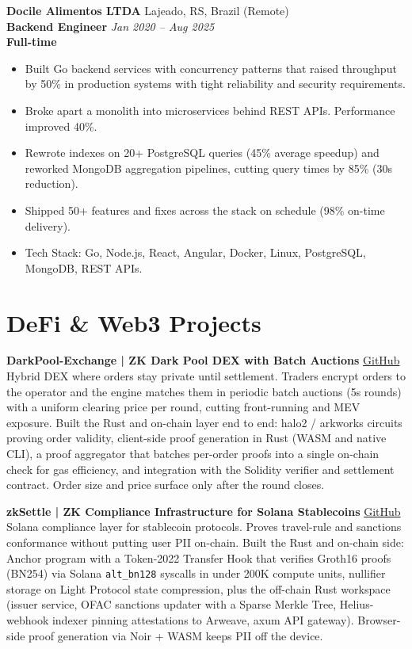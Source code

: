 \documentclass[10pt,a4paper]{article}
\newcommand{\experienceheader}[4]{
    \textbf{\color{subtitlecolor}#1} \hfill #2\\
    \textbf{#3} \hfill \textit{#4}\\
}
\begin{document}
\vspace{2pt}
\experienceheader{Docile Alimentos LTDA}{Lajeado, RS, Brazil (Remote)}{Backend Engineer}{Jan 2020 -- Aug 2025}
\textbf{\footnotesize Full-time}
\begin{itemize}
    \item {\footnotesize Built Go backend services with concurrency patterns that raised throughput by 50\% in production systems with tight reliability and security requirements.}
    \item {\footnotesize Broke apart a monolith into microservices behind REST APIs. Performance improved 40\%.}
    \item {\footnotesize Rewrote indexes on 20+ PostgreSQL queries (45\% average speedup) and reworked MongoDB aggregation pipelines, cutting query times by 85\% (30s reduction).}
    \item {\footnotesize Shipped 50+ features and fixes across the stack on schedule (98\% on-time delivery).}
    \item {\footnotesize Tech Stack: Go, Node.js, React, Angular, Docker, Linux, PostgreSQL, MongoDB, REST APIs.}
\end{itemize}

\section{DeFi \& Web3 Projects}

\vspace{2pt}
\noindent\textbf{\footnotesize DarkPool-Exchange | ZK Dark Pool DEX with Batch Auctions} \textbullet{} {\footnotesize\href{https://github.com/Dnreikronos/DarkPool-Exchange}{GitHub}}\\
{\footnotesize Hybrid DEX where orders stay private until settlement. Traders encrypt orders to the operator and the engine matches them in periodic batch auctions (5s rounds) with a uniform clearing price per round, cutting front-running and MEV exposure. Built the Rust and on-chain layer end to end: halo2 / arkworks circuits proving order validity, client-side proof generation in Rust (WASM and native CLI), a proof aggregator that batches per-order proofs into a single on-chain check for gas efficiency, and integration with the Solidity verifier and settlement contract. Order size and price surface only after the round closes.}

\vspace{2pt}
\noindent\textbf{\footnotesize zkSettle | ZK Compliance Infrastructure for Solana Stablecoins} \textbullet{} {\footnotesize\href{https://github.com/yuribodo/zksettle}{GitHub}}\\
{\footnotesize Solana compliance layer for stablecoin protocols. Proves travel-rule and sanctions conformance without putting user PII on-chain. Built the Rust and on-chain side: Anchor program with a Token-2022 Transfer Hook that verifies Groth16 proofs (BN254) via Solana \texttt{alt\_bn128} syscalls in under 200K compute units, nullifier storage on Light Protocol state compression, plus the off-chain Rust workspace (issuer service, OFAC sanctions updater with a Sparse Merkle Tree, Helius-webhook indexer pinning attestations to Arweave, axum API gateway). Browser-side proof generation via Noir + WASM keeps PII off the device.}
\end{document}
